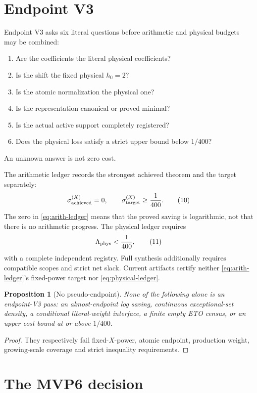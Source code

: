 \documentclass[11pt]{article}
\newtheorem{proposition}[theorem]{Proposition}
\theoremstyle{definition}
\theoremstyle{remark}
\begin{document}
\section{Endpoint V3}

Endpoint V3 asks six literal questions before arithmetic and physical
budgets may be combined:
\begin{enumerate}[label=\textnormal{V3.\arabic*},leftmargin=2.8em]
\item Are the coefficients the literal physical coefficients?
\item Is the shift the fixed physical \(h_0=2\)?
\item Is the atomic normalization the physical one?
\item Is the representation canonical or proved minimal?
\item Is the actual active support completely registered?
\item Does the physical loss satisfy a strict upper bound below
  \(1/400\)?
\end{enumerate}
An unknown answer is not zero cost.

The arithmetic ledger records the strongest achieved theorem and the
target separately:
\[
 \sigma_{\rm achieved}^{(X)}=0,
 \qquad
 \sigma_{\rm target}^{(X)}\geq\frac1{400}.
\tag{10}\label{eq:arith-ledger}
\]
The zero in \cref{eq:arith-ledger} means that the proved saving is
logarithmic, not that there is no arithmetic progress.
The physical ledger requires
\[
 \Lambda_{\rm phys}<\frac1{400},
\tag{11}\label{eq:physical-ledger}
\]
with a complete independent registry.  Full synthesis additionally
requires compatible scopes and strict net slack.  Current artifacts
certify neither \cref{eq:arith-ledger}'s fixed-power target nor
\cref{eq:physical-ledger}.

\begin{proposition}[No pseudo-endpoint]
None of the following alone is an endpoint-V3 pass: an
almost-endpoint log saving, continuous exceptional-set density, a
conditional literal-weight interface, a finite empty ETO census, or
an upper cost bound at or above \(1/400\).
\end{proposition}

\begin{proof}
They respectively fail fixed-\(X\)-power, atomic endpoint, production
weight, growing-scale coverage and strict inequality requirements.
\end{proof}

\section{The MVP6 decision}
\end{document}
